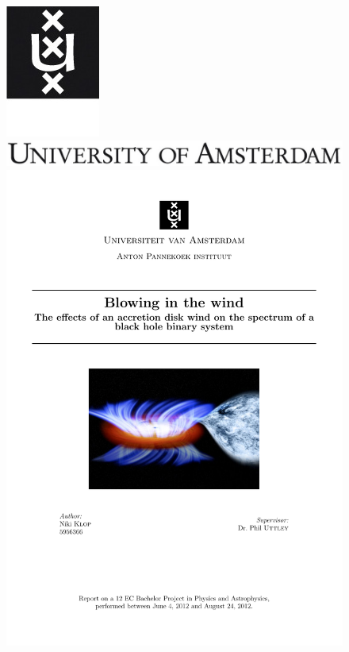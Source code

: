 \documentclass[a4paper]{article}
\begin{document}
\begin{figure}[h!]
\begin{center}
\includegraphics{UvA_Logo_Image_EN.jpg} \\
\includegraphics{UvA_Logo_Text_EN.jpg} \\
\includegraphics{API_Logo_Text.pdf}
\end{center}
\end{figure}
\end{document}
